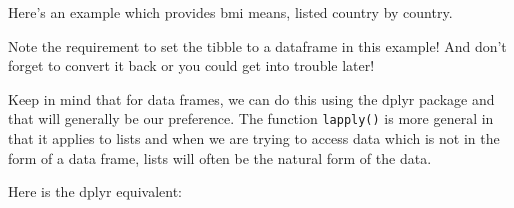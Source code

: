 \documentclass[titlepage]{book}\usepackage{knitr}
\begin{document}
Here's an example which provides bmi means, listed country by country. 

\begin{knitrout}
\color{fgcolor}\begin{kframe}
\begin{alltt}
 \hlkwb{<-} 
 \hlkwb{<-} \hlstd{(} \hlstd{= bP[bP}\hlopt{$} \hlopt{==} \hlstd{,}\hlstd{],}
                     \hlstd{= bP[bP}\hlopt{$} \hlopt{==} \hlstd{,}\hlstd{],}
                     \hlstd{= bP[bP}\hlopt{$} \hlopt{==} \hlstd{,}\hlstd{])}
 
 \hlkwb{<-} 
\end{alltt}
\end{kframe}
\end{knitrout}
Note the requirement to set the tibble to a dataframe in this example!  And don't forget to convert it back or you could get into trouble later!


Keep in mind that for data frames, we can do this using the dplyr package and that will generally be our preference. The function  \texttt{lapply()} is more general in that it applies to lists and when we are trying to access data which is not in the form of a data frame, lists will often be the natural form of the data.

Here is the dplyr equivalent:

\begin{knitrout}
\color{fgcolor}\begin{kframe}
\begin{alltt}
 \hlkwb{<-} 
 \hlkwb{<-}   \hlstd{=}  \hlstd{=}\hlstd{),}  \hlstd{=} 
\end{alltt}
\end{kframe}
\end{knitrout}
\end{document}
